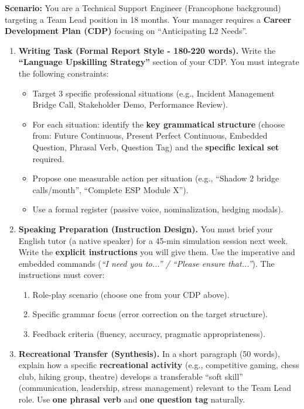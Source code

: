 \documentclass[11pt]{article}
\begin{document}
\begin{exercice}
\textbf{Scenario:} You are a Technical Support Engineer (Francophone background) targeting a Team Lead position in 18 months. Your manager requires a \textbf{Career Development Plan (CDP)} focusing on ``Anticipating L2 Needs''.

\begin{enumerate}
    \item \textbf{Writing Task (Formal Report Style - 180-220 words).} 
    Write the \textbf{``Language Upskilling Strategy''} section of your CDP. You must integrate the following constraints:
    \begin{itemize}
        \item Target 3 specific professional situations (e.g., Incident Management Bridge Call, Stakeholder Demo, Performance Review).
        \item For each situation: identify the \textbf{key grammatical structure} (choose from: Future Continuous, Present Perfect Continuous, Embedded Question, Phrasal Verb, Question Tag) and the \textbf{specific lexical set} required.
        \item Propose one measurable action per situation (e.g., ``Shadow 2 bridge calls/month'', ``Complete ESP Module X'').
        \item Use a formal register (passive voice, nominalization, hedging modals).
    \end{itemize}
    \item \textbf{Speaking Preparation (Instruction Design).} 
    You must brief your English tutor (a native speaker) for a 45-min simulation session next week. Write the \textbf{explicit instructions} you will give them. Use the imperative and embedded commands (\textit{``I need you to...'' / ``Please ensure that...''}). The instructions must cover:
    \begin{enumerate}
        \item Role-play scenario (choose one from your CDP above).
        \item Specific grammar focus (error correction on the target structure).
        \item Feedback criteria (fluency, accuracy, pragmatic appropriateness).
    \end{enumerate}
    \item \textbf{Recreational Transfer (Synthesis).} 
    In a short paragraph (50 words), explain how a specific \textbf{recreational activity} (e.g., competitive gaming, chess club, hiking group, theatre) develops a transferable ``soft skill'' (communication, leadership, stress management) relevant to the Team Lead role. Use \textbf{one phrasal verb} and \textbf{one question tag} naturally.
\end{enumerate}
\end{exercice}
\end{document}
